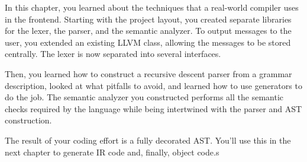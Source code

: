 In this chapter, you learned about the techniques that a real-world compiler uses in the frontend. Starting with the project layout, you created separate libraries for the lexer, the parser, and the semantic analyzer. To output messages to the user, you extended an existing LLVM class, allowing the messages to be stored centrally. The lexer is now separated into several interfaces.

Then, you learned how to construct a recursive descent parser from a grammar description, looked at what pitfalls to avoid, and learned how to use generators to do the job. The semantic analyzer you constructed performs all the semantic checks required by the language while being intertwined with the parser and AST construction.

The result of your coding effort is a fully decorated AST. You’ll use this in the next chapter to generate IR code and, finally, object code.s